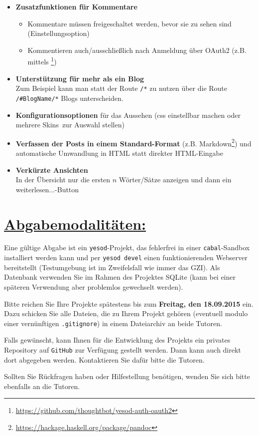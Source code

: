 \documentclass[10pt,a4paper]{article}
\begin{document}
\begin{itemize}
 \item \textbf{Zusatzfunktionen für Kommentare}
       \begin{itemize}
        \item Kommentare müssen freigeschaltet werden, bevor sie zu sehen sind (Einstellungsoption)
        \item Kommentieren auch/ausschließlich nach Anmeldung über OAuth2 (z.B. mittels \footnote{\url{https://github.com/thoughtbot/yesod-auth-oauth2}})
       \end{itemize}
 \item \textbf{Unterstützung für mehr als ein Blog}\\
       Zum Beispiel kann man statt der Route \texttt{/*} zu nutzen über die Route \texttt{/\#BlogName/*} Blogs unterscheiden.
 \item \textbf{Konfigurationsoptionen} für das Aussehen (css einstellbar machen oder mehrere \glqq Skins\grqq \ zur Auswahl stellen)
 \item \textbf{Verfassen der Posts in einem Standard-Format} (z.B. Markdown\footnote{\url{https://hackage.haskell.org/package/pandoc}}) und automatische Umwandlung in HTML statt direkter HTML-Eingabe
 \item \textbf{Verkürzte Ansichten}\\ In der Übersicht nur die ersten $n$ Wörter/Sätze anzeigen und dann ein \glqq weiterlesen...\grqq-Button
\end{itemize}

\section*{\underline{Abgabemodalitäten:}}

Eine gültige Abgabe ist ein \texttt{yesod}-Projekt, das fehlerfrei in einer \texttt{cabal}-Sandbox installiert werden kann und per \texttt{yesod devel} einen funktionierenden Webserver bereitstellt (Testumgebung ist im Zweifelsfall wie immer das GZI). Als Datenbank verwenden Sie im Rahmen des Projektes SQLite (kann bei einer späteren Verwendung aber problemlos gewechselt werden).

Bitte reichen Sie Ihre Projekte spätestens bis zum \textbf{Freitag, den 18.09.2015} ein.
Dazu schicken Sie alle Dateien, die zu Ihrem Projekt gehören (eventuell modulo einer vernünftigen \texttt{.gitignore}) in einem Dateiarchiv an beide Tutoren.\bigskip

Falls gewünscht, kann Ihnen für die Entwicklung des Projekts ein privates Repository auf \texttt{GitHub} zur Verfügung gestellt werden. Dann kann auch direkt dort abgegeben werden. Kontaktieren Sie dafür bitte die Tutoren.\bigskip

Sollten Sie Rückfragen haben oder Hilfestellung benötigen, wenden Sie sich bitte ebenfalls an die Tutoren.
\end{document}
